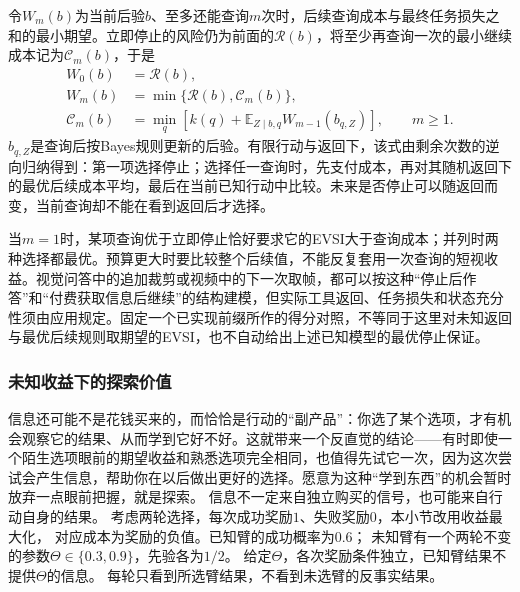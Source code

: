 令\(W_m(b)\)为当前后验\(b\)、至多还能查询\(m\)次时，后续查询成本与最终任务损失之和的最小期望。立即停止的风险仍为前面的\(\mathcal R(b)\)，将至少再查询一次的最小继续成本记为\(\mathcal C_m(b)\)，于是
\begin{equation}
\begin{aligned}
 W_0(b)&=\mathcal R(b),\\
 W_m(b)&=\min\{\mathcal R(b),\mathcal C_m(b)\},\\
 \mathcal C_m(b)&=\min_q\left[k(q)+\mathbb E_{Z\mid b,q}
               W_{m-1}(b_{q,Z})\right],\qquad m\geq1.
 \label{eq:decision-query-stopping-bellman}
\end{aligned}
\end{equation}
\(b_{q,Z}\)是查询后按Bayes规则更新的后验。有限行动与返回下，该式由剩余次数的逆向归纳得到：第一项选择停止；选择任一查询时，先支付成本，再对其随机返回下的最优后续成本平均，最后在当前已知行动中比较。未来是否停止可以随返回而变，当前查询却不能在看到返回后才选择。

当\(m=1\)时，某项查询优于立即停止恰好要求它的EVSI大于查询成本；并列时两种选择都最优。预算更大时要比较整个后续值，不能反复套用一次查询的短视收益。视觉问答中的追加裁剪或视频中的下一次取帧，都可以按这种“停止后作答”和“付费获取信息后继续”的结构建模，但实际工具返回、任务损失和状态充分性须由应用规定。固定一个已实现前缀所作的得分对照，不等同于这里对未知返回与最优后续规则取期望的EVSI，也不自动给出上述已知模型的最优停止保证。

\subsubsection{未知收益下的探索价值}

信息还可能不是花钱买来的，而恰恰是行动的“副产品”：你选了某个选项，才有机会观察它的结果、从而学到它好不好。这就带来一个反直觉的结论——有时即使一个陌生选项眼前的期望收益和熟悉选项完全相同，也值得先试它一次，因为这次尝试会产生信息，帮助你在以后做出更好的选择。愿意为这种“学到东西”的机会暂时放弃一点眼前把握，就是探索。
信息不一定来自独立购买的信号，也可能来自行动自身的结果。
考虑两轮选择，每次成功奖励$1$、失败奖励$0$，本小节改用收益最大化，
对应成本为奖励的负值。已知臂的成功概率为$0.6$；
未知臂有一个两轮不变的参数$\Theta\in\{0.3,0.9\}$，先验各为$1/2$。
给定$\Theta$，各次奖励条件独立，已知臂结果不提供$\Theta$的信息。
每轮只看到所选臂结果，不看到未选臂的反事实结果。

